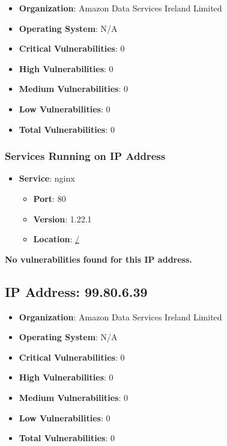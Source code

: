 \documentclass{article}
\begin{document}
\begin{itemize}
    \item \textbf{Organization}: Amazon Data Services Ireland Limited
    \item \textbf{Operating System}:  N/A 
    \item \textbf{Critical Vulnerabilities}: 0
    \item \textbf{High Vulnerabilities}: 0
    \item \textbf{Medium Vulnerabilities}: 0
    \item \textbf{Low Vulnerabilities}: 0
    \item \textbf{Total Vulnerabilities}: 0
\end{itemize}

\subsubsection*{Services Running on IP Address}

\begin{itemize}
    
        \item \textbf{Service}: nginx
        \begin{itemize}
            \item \textbf{Port}: 80
            \item \textbf{Version}:  1.22.1 
            \item \textbf{Location}: \href{ / }{ / }
        \end{itemize}
    
\end{itemize}


\textbf{No vulnerabilities found for this IP address.}




\clearpage



\subsection*{IP Address: 99.80.6.39}

\begin{itemize}
    \item \textbf{Organization}: Amazon Data Services Ireland Limited
    \item \textbf{Operating System}:  N/A 
    \item \textbf{Critical Vulnerabilities}: 0
    \item \textbf{High Vulnerabilities}: 0
    \item \textbf{Medium Vulnerabilities}: 0
    \item \textbf{Low Vulnerabilities}: 0
    \item \textbf{Total Vulnerabilities}: 0
\end{itemize}
\end{document}
